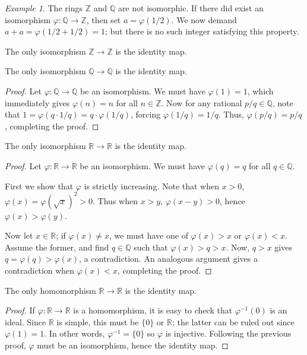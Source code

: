 \documentclass[11pt]{article}
\newcommand{\R}{\mathbb{R}}
\newcommand{\Q}{\mathbb{Q}}
\newcommand{\Z}{\mathbb{Z}}
\theoremstyle{definition}
\theoremstyle{remark}
\newtheorem*{example}{Example}
\numberwithin{equation}{section}
\begin{document}
    \begin{example}
        The rings $\Z$ and $\Q$ are not isomorphic. If there did exist an isomorphism
        $\varphi\colon \Q \to \Z$, then set $a = \varphi(1 / 2)$. We now demand $a +
        a = \varphi(1 / 2 + 1 / 2) = 1$; but there is no such integer satisfying this
        property.
    \end{example}

    \begin{lemma}
        The only isomorphism $\Z \to \Z$ is the identity map.
    \end{lemma}
    \begin{theorem}
        The only isomorphism $\Q \to \Q$ is the identity map.
    \end{theorem}
    \begin{proof}
        Let $\varphi\colon \Q \to \Q$ be an isomorphism. We must have $\varphi(1) =
        1$, which immediately gives $\varphi(n) = n$ for all $n \in \Z$. Now for any
        rational $p / q \in \Q$, note that $1 = \varphi(q \cdot 1 / q) = q \cdot
        \varphi(1 / q)$, forcing $\varphi(1 / q) = 1 / q$. Thus, $\varphi(p / q) = p
        / q$, completing the proof.
    \end{proof}
    
    \begin{theorem}
        The only isomorphism $\R \to \R$ is the identity map.
    \end{theorem}
    \begin{proof}
        Let $\varphi\colon \R \to \R$ be an isomorphism. We must have $\varphi(q)
        = q$ for all $q \in \Q$.

        First we show that $\varphi$ is strictly increasing. Note that when $x > 0$,
        $\varphi(x) = \varphi(\sqrt{x})^2 > 0$. Thus when $x > y$, $\varphi(x - y) >
        0$, hence $\varphi(x) > \varphi(y)$.

        Now let $x \in \R$; if $\varphi(x) \neq x$, we must have one of $\varphi(x) >
        x$ or $\varphi(x) < x$. Assume the former, and find $q \in \Q$ such that
        $\varphi(x) > q > x$. Now, $q > x$ gives $q = \varphi(q) > \varphi(x)$, a
        contradiction.  An analogous argument gives a contradiction when $\varphi(x)
        < x$, completing the proof.
    \end{proof}
    
    \begin{theorem}
        The only homomorphism $\R \to \R$ is the identity map.
    \end{theorem}
    \begin{proof}
        If $\varphi\colon \R \to \R$ is a homomorphism, it is easy to check that
        $\varphi^{-1}(0)$ is an ideal. Since $\R$ is simple, this must be $\{0\}$ or
        $\R$; the latter can be ruled out since $\varphi(1) = 1$. In other words,
        $\varphi^{-1} = \{0\}$ so $\varphi$ is injective. Following the previous
        proof, $\varphi$ must be an isomorphism, hence the identity map.
    \end{proof}
\end{document}
